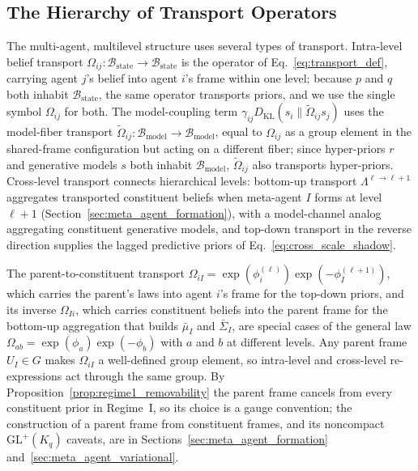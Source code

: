 \documentclass[11pt]{article}
\begin{document}
\subsection{The Hierarchy of Transport Operators}
\label{sec:transport_hierarchy}

The multi-agent, multilevel structure uses several types of transport. Intra-level belief transport $\Omega_{ij}: \mathcal{B}_{\mathrm{state}} \to \mathcal{B}_{\mathrm{state}}$ is the operator of Eq.~\eqref{eq:transport_def}, carrying agent $j$'s belief into agent $i$'s frame within one level; because $p$ and $q$ both inhabit $\mathcal{B}_{\mathrm{state}}$, the same operator transports priors, and we use the single symbol $\Omega_{ij}$ for both. The model-coupling term $\gamma_{ij}D_{\mathrm{KL}}(s_i\|\tilde{\Omega}_{ij}s_j)$ uses the model-fiber transport $\tilde{\Omega}_{ij}: \mathcal{B}_{\mathrm{model}} \to \mathcal{B}_{\mathrm{model}}$, equal to $\Omega_{ij}$ as a group element in the shared-frame configuration but acting on a different fiber; since hyper-priors $r$ and generative models $s$ both inhabit $\mathcal{B}_{\mathrm{model}}$, $\tilde{\Omega}_{ij}$ also transports hyper-priors. Cross-level transport connects hierarchical levels: bottom-up transport $\Lambda^{\ell \to \ell+1}$ aggregates transported constituent beliefs when meta-agent $I$ forms at level $\ell+1$ (Section~\ref{sec:meta_agent_formation}), with a model-channel analog aggregating constituent generative models, and top-down transport in the reverse direction supplies the lagged predictive priors of Eq.~\eqref{eq:cross_scale_shadow}.

The parent-to-constituent transport $\Omega_{iI} = \exp(\phi_i^{(\ell)})\exp(-\phi_I^{(\ell+1)})$, which carries the parent's laws into agent $i$'s frame for the top-down priors, and its inverse $\Omega_{Ii}$, which carries constituent beliefs into the parent frame for the bottom-up aggregation that builds $\bar{\mu}_I$ and $\bar{\Sigma}_I$, are special cases of the general law $\Omega_{ab} = \exp(\phi_a)\exp(-\phi_b)$ with $a$ and $b$ at different levels. Any parent frame $U_I \in G$ makes $\Omega_{iI}$ a well-defined group element, so intra-level and cross-level re-expressions act through the same group. By Proposition~\ref{prop:regime1_removability} the parent frame cancels from every constituent prior in Regime~I, so its choice is a gauge convention; the construction of a parent frame from constituent frames, and its noncompact $\mathrm{GL}^+(K_q)$ caveats, are in Sections~\ref{sec:meta_agent_formation} and~\ref{sec:meta_agent_variational}.
\end{document}
